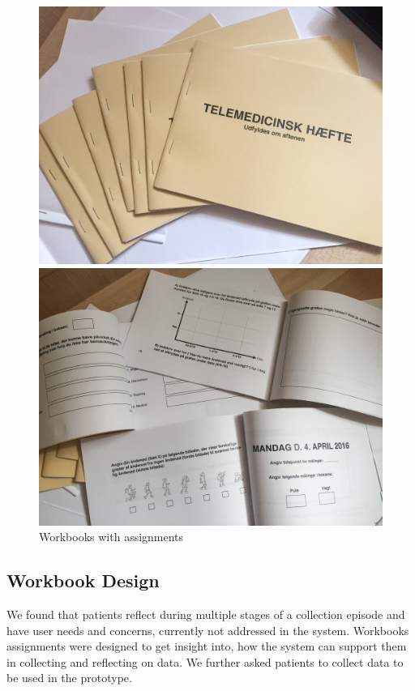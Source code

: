 \begin{figure}[!htb]
 \centering
 \begin{minipage}[b]{0.23\textwidth}
   \includegraphics[width=\textwidth]{img/workbook}
 \end{minipage}
 \hfill
 \begin{minipage}[b]{0.23\textwidth}
   \includegraphics[width=\textwidth]{img/workbook2}
 \end{minipage}
  \caption{Workbooks with assignments}
\end{figure}

\subsection{Workbook Design}
We found that patients reflect during multiple stages of a collection episode and have user needs and concerns, currently not addressed in the system. Workbooks assignments were designed to get insight into, how the system can support them in collecting and reflecting on data. We further asked patients to collect data to be used in the prototype.

